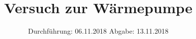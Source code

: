 

\subject{V206 - Die Wärmepumpe}
\title{Versuch zur Wärmepumpe}
\date{
  Durchführung: 06.11.2018
  \hspace{3em}
  Abgabe: 13.11.2018
}



\maketitle
\thispagestyle{empty}
\tableofcontents
\newpage





\nocite{206}

\printbibliography{}


